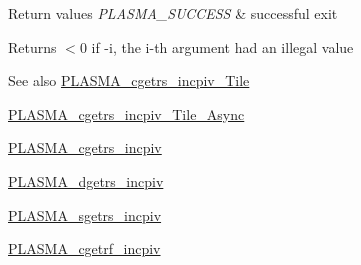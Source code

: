 \begin{DoxyRetVals}{Return values}
{\em P\+L\+A\+S\+M\+A\+\_\+\+S\+U\+C\+C\+E\+S\+S} & successful exit \\
\hline
\end{DoxyRetVals}
\begin{DoxyReturn}{Returns}
$<$0 if -\/i, the i-\/th argument had an illegal value
\end{DoxyReturn}
\begin{DoxySeeAlso}{See also}
\hyperlink{group__PLASMA__Complex32__t__Tile_ga7c9bc594ee6cc9fc05964ab8cbb47b34_ga7c9bc594ee6cc9fc05964ab8cbb47b34}{P\+L\+A\+S\+M\+A\+\_\+cgetrs\+\_\+incpiv\+\_\+\+Tile} 

\hyperlink{group__PLASMA__Complex32__t__Tile__Async_ga9bcd7cb920176038984cf1490a80c996_ga9bcd7cb920176038984cf1490a80c996}{P\+L\+A\+S\+M\+A\+\_\+cgetrs\+\_\+incpiv\+\_\+\+Tile\+\_\+\+Async} 

\hyperlink{group__PLASMA__Complex32__t_ga0f056cec00c55830b06c4439d4892165_ga0f056cec00c55830b06c4439d4892165}{P\+L\+A\+S\+M\+A\+\_\+cgetrs\+\_\+incpiv} 

\hyperlink{group__double_ga39d27f0353921e5b63e0fdc9cca4b19c_ga39d27f0353921e5b63e0fdc9cca4b19c}{P\+L\+A\+S\+M\+A\+\_\+dgetrs\+\_\+incpiv} 

\hyperlink{group__float_gae593ed2d7e164acc75c4e6efdca4d95a_gae593ed2d7e164acc75c4e6efdca4d95a}{P\+L\+A\+S\+M\+A\+\_\+sgetrs\+\_\+incpiv} 

\hyperlink{group__PLASMA__Complex32__t_gaaeca906ffb473a1bc1772671fb4f558f_gaaeca906ffb473a1bc1772671fb4f558f}{P\+L\+A\+S\+M\+A\+\_\+cgetrf\+\_\+incpiv} 
\end{DoxySeeAlso}
\hypertarget{group__PLASMA__Complex32__t_ga0d2fe45268be2c3d25593d80dd0c547f_ga0d2fe45268be2c3d25593d80dd0c547f}{}
